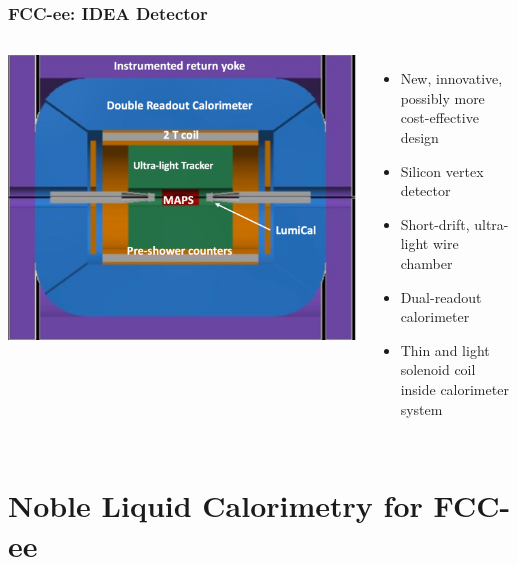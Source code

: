 \documentclass[aspectratio=169]{beamer}
\begin{document}
\begin{frame}
  \frametitle{FCC-ee: IDEA Detector}

  \begin{columns}[c]
    \begin{center}
      \includegraphics[width=\linewidth]{figures/FCC_ee_IDEA.png}
    \end{center}

    \begin{itemize}
      \item New, innovative, possibly more cost-effective design
      \item Silicon vertex detector
      \item Short-drift, ultra-light wire chamber
      \item Dual-readout calorimeter
      \item Thin and light solenoid coil inside calorimeter system
    \end{itemize}
  \end{columns}
\end{frame}


%
%
\section{Noble Liquid Calorimetry for FCC-ee}
\end{document}
